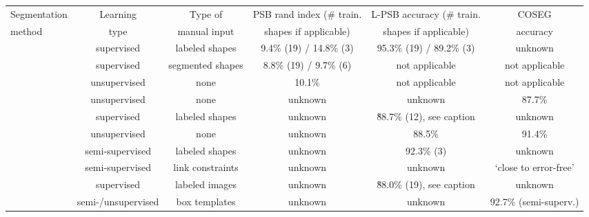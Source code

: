 \begin{table*}[t!]
\small
  \centering
    \begin{tabular*}{\textwidth}{l|c|c|c|c|c@{}}
    \hline
    Segmentation                & Learning           & Type of          & PSB rand index (\# train. & L-PSB  accuracy (\# train.  & COSEG          \\
    method                      & type               & manual input     & shapes if applicable)     & shapes if applicable)       & accuracy       \\
    \hline
    \hline
    \cite{Kalogerakis:2010:LMS} & supervised         & labeled shapes   & 9.4\% (19) / 14.8\% (3)   & 95.3\% (19) / 89.2\% (3)    & unknown        \\
    \hline
    \cite{Benhabiles:2011:LBE}  & supervised         & segmented shapes & 8.8\% (19) / 9.7\% (6)    & not applicable              & not applicable \\
    \hline
    \cite{Huang:2011:JSS}       & unsupervised       & none             & 10.1\%                    & not applicable              & not applicable \\
    \hline
    \cite{Sidi:2011:CS}         & unsupervised       & none             & unknown                   & unknown                     & 87.7\%         \\
    \hline
    \cite{van-Kaick:2011:PKC}   & supervised         & labeled shapes   & unknown                   & \~88.7\% (12), see caption   & unknown        \\
    \hline
    \cite{Hu:2012:CSS}          & unsupervised       & none             & unknown                   & 88.5\%                      & 91.4\%         \\
    \hline
    \cite{Lv:2012:SMS}          & semi-supervised    & labeled shapes   & unknown                   & 92.3\% (3)                  & unknown        \\
    \hline
    \cite{Wang:2012:ACS}        & semi-supervised    & link constraints & unknown                   & unknown                     & `close to error-free' \\
    \hline
    \cite{Wang:2013:PAS}        & supervised         & labeled images   & unknown                   & \~88.0\% (19), see caption   & unknown               \\
    \hline
    \cite{Kim:2013:lpt}         & semi-/unsupervised & box templates    & unknown                   & unknown                     & 92.7\% (semi-superv.) \\

\end{tabular*}
\end{table*}
